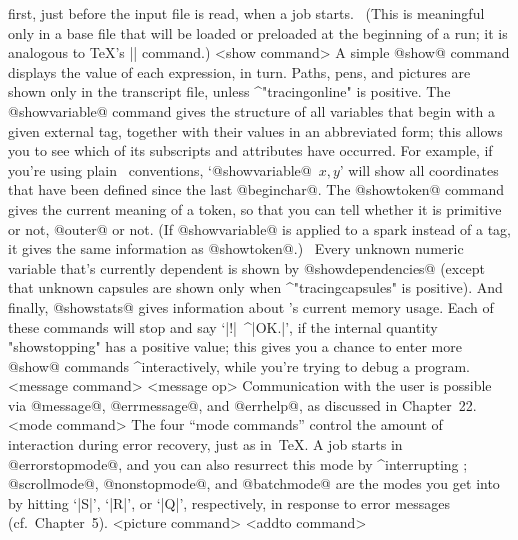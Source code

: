 first, just before the input file is read, when a job starts. \ (This
is meaningful only in a base file that will be loaded or preloaded
at the beginning of a run; it is analogous to \TeX's |\everyjob| command.)
\beginsyntax
<show command>
 \alt[showdependencies]
 \alt[showstats]
\endsyntax
A simple @show@ command displays the value of each expression, in turn.
Paths, pens, and pictures are shown only in the transcript file, unless
^"tracingonline" is positive. The @showvariable@ command gives the
structure of all variables that begin with a given external tag,
together with their values in an abbreviated form; this allows you to see
which of its subscripts and attributes have occurred. For example, if you're
using plain \MF\ conventions, `@showvariable@~$x,y$' will show all
coordinates that have been defined since the last @beginchar@. The @showtoken@
command gives the current meaning of a token, so that you can tell whether
it is primitive or not, @outer@ or not. (If @showvariable@ is applied to
a spark instead of a tag, it gives the same information as @showtoken@.)
\ Every unknown numeric variable that's currently dependent is shown by
@showdependencies@ (except that unknown capsules are shown only
when ^"tracingcapsules" is positive). And finally, @showstats@ gives
information about \MF's current memory usage.
Each of these commands will stop and say `|!|~^|OK.|', if the internal
quantity "showstopping" has a positive value; this gives you a chance
to enter more @show@ commands ^{interactive}ly, while you're trying to
debug a program.
\beginsyntax
<message command>
<message op>\is[message]\alt[errmessage]\alt[errhelp]
\endsyntax
Communication with the user is possible via @message@, @errmessage@,
and @errhelp@, as discussed in Chapter~22.
\beginsyntax
<mode command>\is[batchmode]\alt[nonstopmode]
 \alt[scrollmode]\alt[errorstopmode]
\endsyntax
The four ``mode commands'' control the amount of interaction during error
recovery, just as in~\TeX. A job starts in @errorstopmode@, and you can
also resurrect this mode by ^{interrupting} \MF; @scrollmode@,
@nonstopmode@, and @batchmode@ are the modes you get into by hitting
`|S|', `|R|', or `|Q|', respectively, in response to error messages
(cf.~Chapter~5).
\beginsyntax
<picture command>
<addto command>
